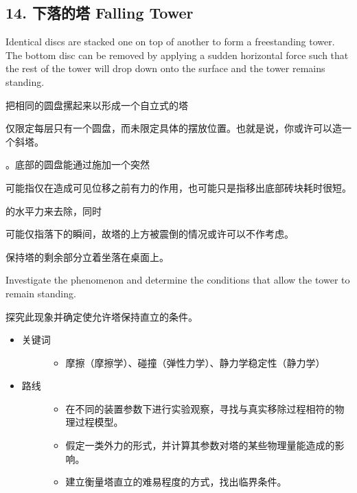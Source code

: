 \documentclass[a4paper,10pt,english]{sphinxmanual}
\begin{document}
\subsection{14. 下落的塔 Falling Tower}
\label{\detokenize{7. Appendix:falling-tower}}
Identical discs are stacked one on top of another to form a freestanding tower. The bottom disc can be removed by applying a sudden horizontal force such that the rest of the tower will drop down onto the surface and the tower remains standing.

把相同的圆盘摞起来以形成一个自立式的塔 %
\begin{footnote}[8]\sphinxAtStartFootnote
仅限定每层只有一个圆盘，而未限定具体的摆放位置。也就是说，你或许可以造一个斜塔。
%
\end{footnote} 。底部的圆盘能通过施加一个突然 %
\begin{footnote}[9]\sphinxAtStartFootnote
可能指仅在造成可见位移之前有力的作用，也可能只是指移出底部砖块耗时很短。
%
\end{footnote} 的水平力来去除，同时 %
\begin{footnote}[10]\sphinxAtStartFootnote
可能仅指落下的瞬间，故塔的上方被震倒的情况或许可以不作考虑。
%
\end{footnote} 保持塔的剩余部分立着坐落在桌面上。

Investigate the phenomenon and determine the conditions that allow the tower to remain standing.

探究此现象并确定使允许塔保持直立的条件。
\begin{itemize}
\item {} \begin{description}
\item[{关键词}] \leavevmode\begin{itemize}
\item {} 
摩擦（摩擦学）、碰撞（弹性力学）、静力学稳定性（静力学）

\end{itemize}

\end{description}

\item {} \begin{description}
\item[{路线}] \leavevmode\begin{itemize}
\item {} 
在不同的装置参数下进行实验观察，寻找与真实移除过程相符的物理过程模型。

\item {} 
假定一类外力的形式，并计算其参数对塔的某些物理量能造成的影响。

\item {} 
建立衡量塔直立的难易程度的方式，找出临界条件。

\end{itemize}

\end{description}

\end{itemize}
\end{document}

